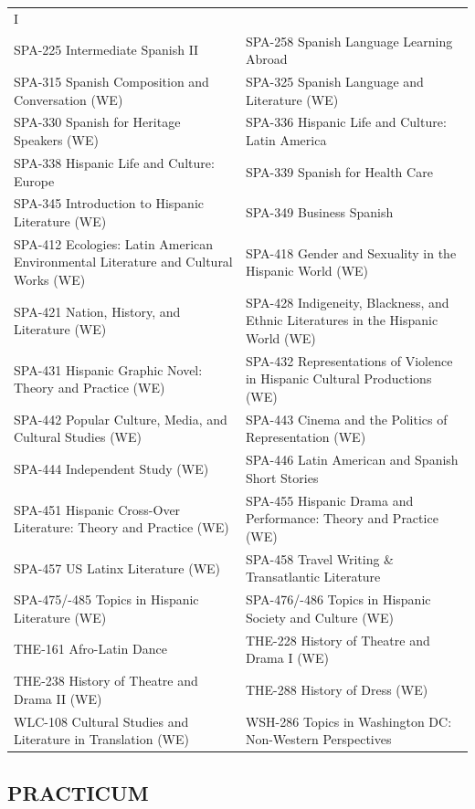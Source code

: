 \documentclass[
  letterpaper,
]{scrbook}
\begin{document}
{\begin{longtable}[]{@{}
  >{\raggedright\arraybackslash}p{}
  >{\raggedright\arraybackslash}p{}@{}}
I \\
SPA-225 Intermediate Spanish II & SPA-258 Spanish Language Learning
Abroad \\
SPA-315 Spanish Composition and Conversation (WE) & SPA-325 Spanish
Language and Literature (WE) \\
SPA-330 Spanish for Heritage Speakers (WE) & SPA-336 Hispanic Life and
Culture: Latin America \\
SPA-338 Hispanic Life and Culture: Europe & SPA-339 Spanish for Health
Care \\
SPA-345 Introduction to Hispanic Literature (WE) & SPA-349 Business
Spanish \\
SPA-412 Ecologies: Latin American Environmental Literature and Cultural
Works (WE) & SPA-418 Gender and Sexuality in the Hispanic World (WE) \\
SPA-421 Nation, History, and Literature (WE) & SPA-428 Indigeneity,
Blackness, and Ethnic Literatures in the Hispanic World (WE) \\
SPA-431 Hispanic Graphic Novel: Theory and Practice (WE) & SPA-432
Representations of Violence in Hispanic Cultural Productions (WE) \\
SPA-442 Popular Culture, Media, and Cultural Studies (WE) & SPA-443
Cinema and the Politics of Representation (WE) \\
SPA-444 Independent Study (WE) & SPA-446 Latin American and Spanish
Short Stories \\
SPA-451 Hispanic Cross-Over Literature: Theory and Practice (WE) &
SPA-455 Hispanic Drama and Performance: Theory and Practice (WE) \\
SPA-457 US Latinx Literature (WE) & SPA-458 Travel Writing \&
Transatlantic Literature \\
SPA-475/-485 Topics in Hispanic Literature (WE) & SPA-476/-486 Topics in
Hispanic Society and Culture (WE) \\
THE-161 Afro-Latin Dance & THE-228 History of Theatre and Drama I
(WE) \\
THE-238 History of Theatre and Drama II (WE) & THE-288 History of Dress
(WE) \\
WLC-108 Cultural Studies and Literature in Translation (WE) & WSH-286
Topics in Washington DC: Non-Western Perspectives \\
\end{longtable}
}

\subsection{PRACTICUM}\label{practicum}
\end{document}
